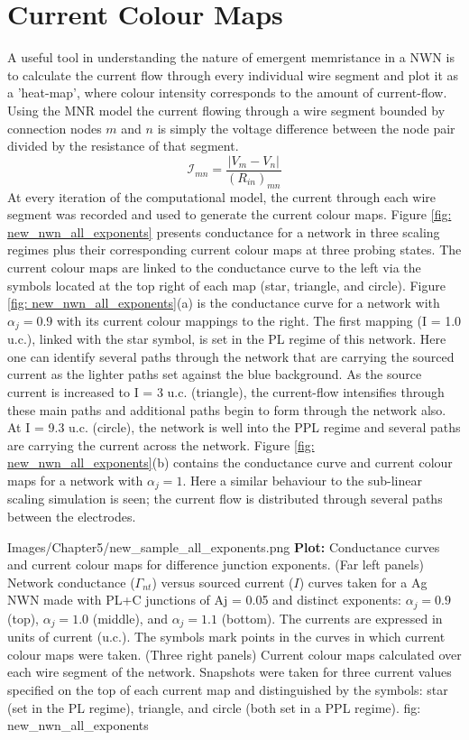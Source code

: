\section{Current Colour Maps}
\label{Sec: current_colour}
A useful tool in understanding the nature of emergent memristance in a NWN is to calculate the current flow through every individual wire segment and plot it as a 'heat-map', where colour intensity corresponds to the amount of current-flow. Using the MNR model the current flowing through a wire segment bounded by connection nodes $m$ and $n$ is simply the voltage difference between the node pair divided by the resistance of that segment.
\begin{equation}
\mathcal{I}_{\textit{mn}} = \frac{|V_\textit{m} - V_\textit{n}|}{(R_{in})_{\textit{mn}}}
\end{equation}
At every iteration of the computational model, the current through each wire segment was recorded and used to generate the current colour maps. Figure \ref{fig: new_nwn_all_exponents} presents conductance for a network in three scaling regimes plus their corresponding current colour maps at three probing states. The current colour maps are linked to the conductance curve to the left via the symbols located at the top right of each map (star, triangle, and circle). Figure \ref{fig: new_nwn_all_exponents}(a) is the conductance curve for a network with $\alpha_j = 0.9$ with its current colour mappings to the right. The first mapping (I = 1.0 u.c.), linked with the star symbol, is set in the PL regime of this network. Here one can identify several paths through the network that are carrying the sourced current as the lighter paths set against the blue background. As the source current is increased to I = 3 u.c. (triangle), the current-flow intensifies through these main paths and additional paths begin to form through the network also. At I = 9.3 u.c. (circle), the network is well into the PPL regime and several paths are carrying the current across the network. Figure \ref{fig: new_nwn_all_exponents}(b) contains the conductance curve and current colour maps for a network with $\alpha_j = 1$. Here a similar behaviour to the sub-linear scaling simulation is seen; the current flow is distributed through several paths between the electrodes.

{Images/Chapter5/new_sample_all_exponents.png}
{\textbf{Plot:} Conductance curves and current colour maps for difference junction exponents.}
{(Far left panels) Network conductance ($\Gamma_{nt}$) versus sourced current ($I$) curves taken for a Ag NWN made with PL+C junctions of Aj = 0.05 and distinct exponents: $\alpha_j = 0.9$ (top), $\alpha_j = 1.0$ (middle), and $\alpha_j = 1.1$ (bottom). The currents are expressed in units of current (u.c.). The symbols mark points in the curves in which current colour maps were taken. (Three right panels) Current colour maps calculated over each wire segment of the network. Snapshots were taken for three current values specified on the top of each current map and distinguished by the symbols: star (set in the PL regime), triangle, and circle (both set in a PPL regime)\cite{scaling2018}. }
{fig: new_nwn_all_exponents}

